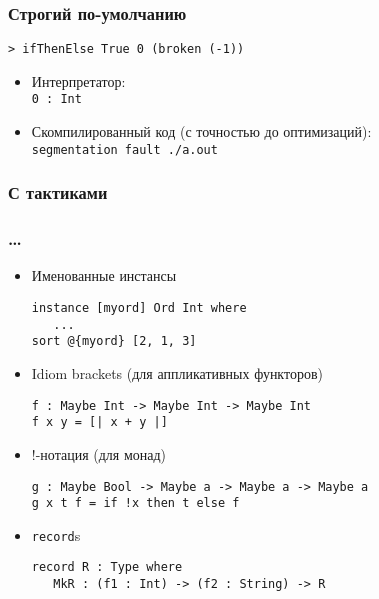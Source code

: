 \begin{frame}[fragile]
   \frametitle{Строгий по-умолчанию}
   
   \texttt{> ifThenElse True 0 (broken (-1))}\\
   \begin{itemize}
   \item Интерпретатор:\\
      \texttt{0 : Int}\\
   \item Скомпилированный код (с точностью до оптимизаций):\\
      \texttt{segmentation fault ./a.out}
   \end{itemize}
\end{frame}

\begin{frame}[fragile]
   \frametitle{С тактиками}
   
\end{frame}

\begin{frame}[fragile]
   \frametitle{\dots}
   \begin{itemize}
   \item Именованные инстансы
         \begin{lstlisting}
instance [myord] Ord Int where
   ...
sort @{myord} [2, 1, 3]
         \end{lstlisting}
   \item Idiom brackets (для аппликативных функторов)
         \begin{lstlisting}
f : Maybe Int -> Maybe Int -> Maybe Int
f x y = [| x + y |]
         \end{lstlisting}
   \item !-нотация (для монад)
         \begin{lstlisting}
g : Maybe Bool -> Maybe a -> Maybe a -> Maybe a
g x t f = if !x then t else f
         \end{lstlisting}
   \item \texttt{\color{kwcolor}record}s
      \begin{lstlisting}
record R : Type where
   MkR : (f1 : Int) -> (f2 : String) -> R
      \end{lstlisting}
   \end{itemize}
\end{frame}

